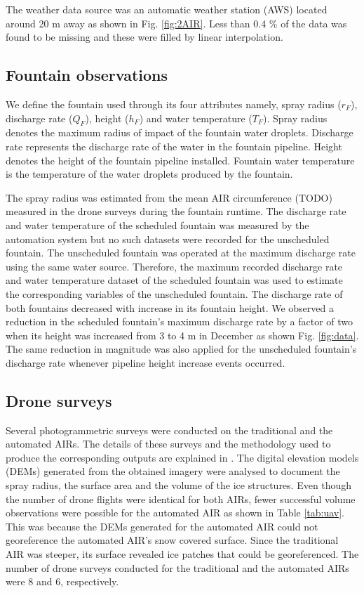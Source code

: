 \documentclass[tc, manuscript]{copernicus}
\begin{document}
The weather data source was an automatic weather station (AWS) located around 20 m away as shown in Fig.
\ref{fig:2AIR}. Less than 0.4 \% of the data was found to be missing and these were filled by linear
interpolation. 

\subsection{Fountain observations}

We define the fountain used through its four attributes namely, spray radius ($r_F$), discharge rate ($Q_F$),
height ($h_F$) and water temperature ($T_F$). Spray radius denotes the maximum radius of impact of the fountain
water droplets. Discharge rate represents the discharge rate of the water in the fountain pipeline. Height
denotes the height of the fountain pipeline installed. Fountain water temperature is the temperature of the
water droplets produced by the fountain.

The spray radius was estimated from the mean AIR circumference (TODO) measured in the drone surveys during the fountain
runtime. The discharge rate and water temperature of the scheduled fountain was measured by the automation
system but no such datasets were recorded for the unscheduled fountain. The unscheduled fountain was operated at
the maximum discharge rate using the same water source. Therefore, the maximum recorded discharge rate and water
temperature dataset of the scheduled fountain was used to estimate the corresponding variables of the
unscheduled fountain. The discharge rate of both fountains decreased with increase in its fountain height. We
observed a reduction in the scheduled fountain's maximum discharge rate by a factor of two when its height was
increased from 3 to 4 m in December as shown Fig. \ref{fig:data}. The same reduction in magnitude was also
applied for the unscheduled fountain's discharge rate whenever pipeline height increase events occurred. 

\subsection{Drone surveys}

Several photogrammetric surveys were conducted on the traditional and the automated AIRs. The details of these
surveys and the methodology used to produce the corresponding outputs are explained in
\cite{balasubramanianInfluenceMeteorologicalConditions2022}. The digital elevation models (DEMs) generated from
the obtained imagery were analysed to document the spray radius, the surface area and the volume of the ice
structures. Even though the number of drone flights were identical for both AIRs, fewer successful volume
observations were possible for the automated AIR as shown in Table \ref{tab:uav}. This was because the DEMs
generated for the automated AIR could not georeference the automated AIR's snow covered surface. Since the
traditional AIR was steeper, its surface revealed ice patches that could be georeferenced. The number of drone
surveys conducted for the traditional and the automated AIRs were 8 and 6, respectively. 
\end{document}
